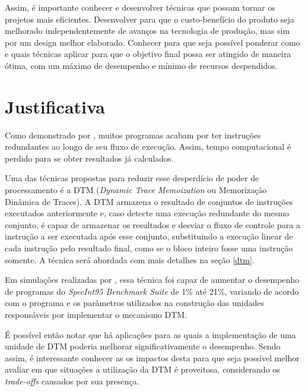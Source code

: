 Assim, é importante conhecer e desenvolver técnicas que possam tornar os projetos mais eficientes. Desenvolver para que o custo-benefício do produto seja melhorado independentemente de avanços na tecnologia de produção, mas sim por um design melhor elaborado. Conhecer para que seja possível ponderar como e quais técnicas aplicar para que o objetivo final possa ser atingido de maneira ótima, com um máximo de desempenho e mínimo de recursos despendidos.



\section{Justificativa}
\label{Introducao:Justificativa} %


Como demonstrado por , muitos programas acabam por ter instruções redundantes ao longo de seu fluxo de execução. Assim, tempo computacional é perdido para se obter resultados já calculados.

Uma das técnicas propostas para reduzir esse desperdício de poder de processamento é a DTM (\textit{Dynamic Trace Memoization} ou Memorização Dinâmica de Traces). A DTM armazena o resultado de conjuntos de instruções executados anteriormente e, caso detecte uma execução redundante do mesmo conjunto, é capaz de armazenar os resultados e desviar o fluxo de controle para a instrução a ser executada após esse conjunto, substituindo a execução linear de cada instrução pelo resultado final, como se o bloco inteiro fosse uma instrução somente. A técnica será abordada com mais detalhes na seção \ref{dtm}.

Em simulações realizadas por , essa técnica foi capaz de aumentar o desempenho de programas do \textit{SpecInt95 Benchmark Suite} de 1\% até 21\%, variando de acordo com o programa e os parâmetros utilizados na construção das unidades responsáveis por implementar o mecanismo DTM.

É possível então notar que há aplicações para as quais a implementação de uma unidade de DTM poderia melhorar significativamente o desempenho. Sendo assim, é interessante conhecer as os impactos desta para que seja possível melhor avaliar em que situações a utilização da DTM é proveitosa, considerando os \textit{trade-offs} causados por sua presença.

